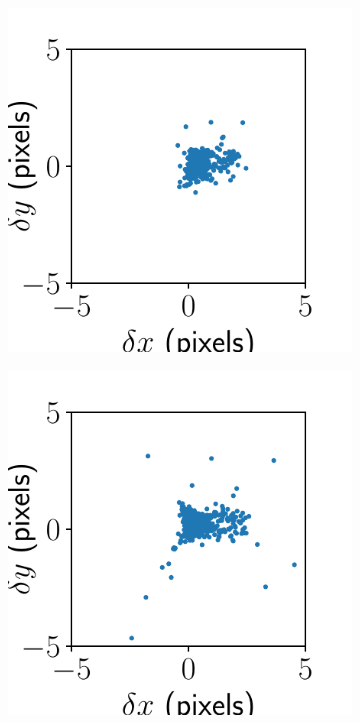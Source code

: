\documentclass{article}
\begin{document}
\begin{figure}[ht]
\begin{subfigure}{0.24\linewidth}
		\caption{}
		\label{fig:alignmentresultJHUPolaris3}
	\end{subfigure}
	\begin{subfigure}{0.24\linewidth}
		\includegraphics[width=\linewidth]{alignment-result-JHUPolaris-2.pdf}
		\caption{}
		\label{fig:alignmentresultJHUPolaris2}
	\end{subfigure}
	\begin{subfigure}{0.24\linewidth}
		\includegraphics[width=\linewidth]{alignment-result-JHUPolaris-1.pdf}

\end{subfigure}
\end{figure}
\end{document}
